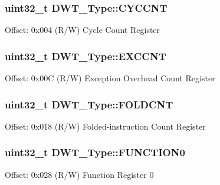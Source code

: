 \subsubsection[{\texorpdfstring{C\+Y\+C\+C\+NT}{CYCCNT}}]{ uint32\+\_\+t D\+W\+T\+\_\+\+Type\+::\+C\+Y\+C\+C\+NT}\hypertarget{struct_d_w_t___type_a71680298e85e96e57002f87e7ab78fd4}{}\label{struct_d_w_t___type_a71680298e85e96e57002f87e7ab78fd4}
Offset\+: 0x004 (R/W) Cycle Count Register 
\subsubsection[{\texorpdfstring{E\+X\+C\+C\+NT}{EXCCNT}}]{ uint32\+\_\+t D\+W\+T\+\_\+\+Type\+::\+E\+X\+C\+C\+NT}\hypertarget{struct_d_w_t___type_ac0801a2328f3431e4706fed91c828f82}{}\label{struct_d_w_t___type_ac0801a2328f3431e4706fed91c828f82}
Offset\+: 0x00C (R/W) Exception Overhead Count Register 
\subsubsection[{\texorpdfstring{F\+O\+L\+D\+C\+NT}{FOLDCNT}}]{ uint32\+\_\+t D\+W\+T\+\_\+\+Type\+::\+F\+O\+L\+D\+C\+NT}\hypertarget{struct_d_w_t___type_a35f2315f870a574e3e6958face6584ab}{}\label{struct_d_w_t___type_a35f2315f870a574e3e6958face6584ab}
Offset\+: 0x018 (R/W) Folded-\/instruction Count Register 
\subsubsection[{\texorpdfstring{F\+U\+N\+C\+T\+I\+O\+N0}{FUNCTION0}}]{ uint32\+\_\+t D\+W\+T\+\_\+\+Type\+::\+F\+U\+N\+C\+T\+I\+O\+N0}\hypertarget{struct_d_w_t___type_a5fbd9947d110cc168941f6acadc4a729}{}\label{struct_d_w_t___type_a5fbd9947d110cc168941f6acadc4a729}
Offset\+: 0x028 (R/W) Function Register 0 
